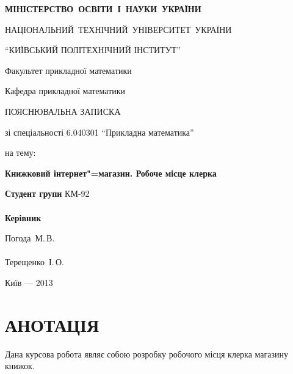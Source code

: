 \documentclass[a4paper,notitlepage,headsepline,pdftex,oneside]{report}
\newcommand{\setfontsize}[1]{\fontsize{#1pt}{#1pt}\selectfont}
\newcommand{\uChapter}[1]{\chapter*{#1}\pagestyle{fancy}\renewcommand{\baselinestretch}{1.5}\setfontsize{14pt}}
\begin{document}
\setfontsize{14pt}
\renewcommand{\baselinestretch}{1.5}
\begin{titlepage}
  \begin{center}
\setfontsize{14pt}
\renewcommand{\baselinestretch}{1.5}
{\bf
    \mbox{\MakeUppercase{Міністерство освіти і науки України}}

    \mbox{\MakeUppercase{Національний технічний університет України}}

    \MakeUppercase{``Київський політехнічний інститут''}

    \vspace{2cm}


    Факультет прикладної математики

    Кафедра прикладної математики

    \vfill

    ПОЯСНЮВАЛЬНА ЗАПИСКА
  }

    зі спеціальності 6.040301 ``Прикладна математика''

    на тему:

    \textbf{Книжковий інтернет"=магазин. Робоче місце клерка}
  \end{center}

  \vfill

  \begin{minipage}{0.4\textwidth}
  \noindent
  \textbf{Студент групи} КМ-92\\
  \hspace{1cm}\\
  \noindent
  \textbf{Керівник}\\
  \end{minipage}
  \begin{minipage}{0.4\textwidth}
    \noindent
    Погода~М.\,В.\hfill\underline{\hspace{1.5cm}}\\
    \hspace{1cm}\\
    \noindent
    Терещенко~І.\,О.\hfill\underline{\hspace{1.5cm}}\\
  \end{minipage}

  \vfill

  \begin{center}
    Київ --- 2013
  \end{center}
\end{titlepage}
\uChapter{АНОТАЦІЯ}
  Дана курсова робота являє собою розробку робочого місця клерка магазину
  книжок.
\end{document}
